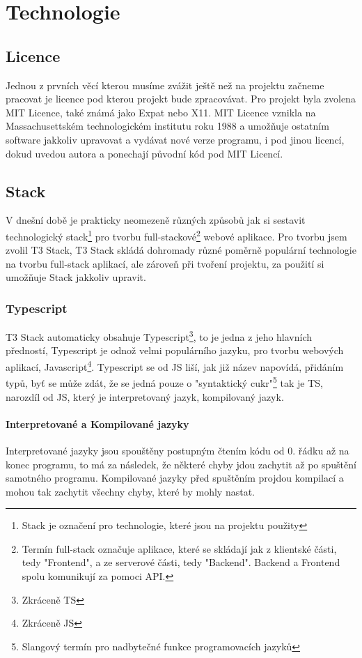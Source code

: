 \chapter{Technologie}
\section{Licence}
Jednou z prvních věcí kterou musíme zvážit ještě než na projektu začneme pracovat je licence pod kterou projekt bude zpracovávat. Pro projekt byla zvolena MIT Licence, také známá jako Expat nebo X11\cite{GNU-Mit}. MIT Licence vznikla na Massachusettském technologickém institutu roku 1988 a umožňuje ostatním software jakkoliv upravovat a vydávat nové verze programu, i pod jinou licencí, dokud uvedou autora a ponechají původní kód pod MIT Licencí\cite{Github-Mit}.
\section{Stack}
V dnešní době je prakticky neomezeně různých způsobů jak si sestavit technologický stack\footnote{Stack je označení pro technologie, které jsou na projektu použity} pro tvorbu full-stackové\footnote{Termín full-stack označuje aplikace, které se skládají jak z klientské části, tedy "Frontend", a ze serverové části, tedy "Backend". Backend a Frontend spolu komunikují za pomoci API.} webové aplikace.
Pro tvorbu jsem zvolil T3 Stack, T3 Stack skládá dohromady různé poměrně populární technologie na tvorbu full-stack aplikací, ale zároveň při tvoření projektu, za použití  si umožňuje Stack jakkoliv upravit\cite{t3stack}.
\subsection{Typescript}
T3 Stack automaticky obsahuje Typescript\footnote{Zkráceně TS}, to je jedna z jeho hlavních předností, Typescript je odnož velmi populárního jazyku, pro tvorbu webových aplikací, Javascript\footnote{Zkráceně JS}. Typescript se od JS liší, jak již název napovídá, přidáním typů, byť se může zdát, že se jedná pouze o "syntaktický cukr"\footnote{Slangový termín pro nadbytečné funkce programovacích jazyků} tak je TS, narozdíl od JS, který je interpretovaný jazyk, kompilovaný jazyk.
\subsubsection{Interpretované a Kompilované jazyky}
Interpretované jazyky jsou spouštěny postupným čtením kódu od 0. řádku až na konec programu, to má za následek, že některé chyby jdou zachytit až po spuštění samotného programu. Kompilované jazyky před spuštěním projdou kompilací a mohou tak zachytit všechny chyby, které by mohly nastat.

